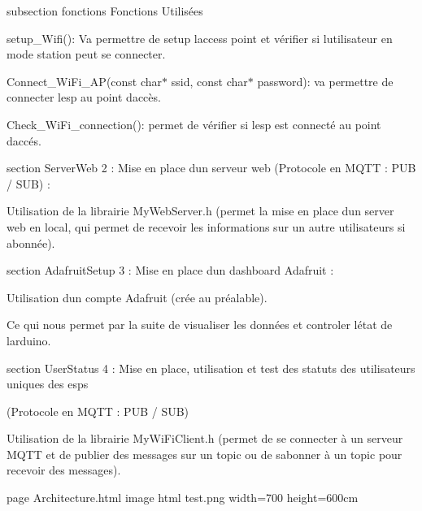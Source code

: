 subsection fonctions Fonctions Utilisées
\begin{DoxyItemize}
\item setup\+\_\+\+Wifi()\+: Va permettre de setup l\textquotesingle{}access point et vérifier si l\textquotesingle{}utilisateur en mode station peut se connecter.
\item Connect\+\_\+\+Wi\+Fi\+\_\+\+AP(const char$\ast$ ssid, const char$\ast$ password)\+: va permettre de connecter l\textquotesingle{}esp au point d\textquotesingle{}accès.
\item Check\+\_\+\+Wi\+Fi\+\_\+connection()\+: permet de vérifier si l\textquotesingle{}esp est connecté au point d\textquotesingle{}accés.
\end{DoxyItemize}

section Server\+Web 2 \+: Mise en place d\textquotesingle{}un serveur web (Protocole en MQTT \+: PUB / SUB) \+:
\begin{DoxyItemize}
\item Utilisation de la librairie My\+Web\+Server.\+h (permet la mise en place d\textquotesingle{}un server web en local, qui permet de recevoir les informations sur un autre utilisateurs si abonnée).
\end{DoxyItemize}

section Adafruit\+Setup 3 \+: Mise en place d\textquotesingle{}un dashboard Adafruit \+:
\begin{DoxyItemize}
\item Utilisation d\textquotesingle{}un compte Adafruit (crée au préalable).
\item Ce qui nous permet par la suite de visualiser les données et controler l\textquotesingle{}état de l\textquotesingle{}arduino.
\end{DoxyItemize}

section User\+Status 4 \+: Mise en place, utilisation et test des statuts des utilisateurs uniques des esps
\begin{DoxyItemize}
\item (Protocole en MQTT \+: PUB / SUB)
\item Utilisation de la librairie My\+Wi\+Fi\+Client.\+h (permet de se connecter à un serveur MQTT et de publier des messages sur un topic ou de s\textquotesingle{}abonner à un topic pour recevoir des messages).
\end{DoxyItemize}

page Architecture.\+html image html test.\+png width=700 height=600cm 